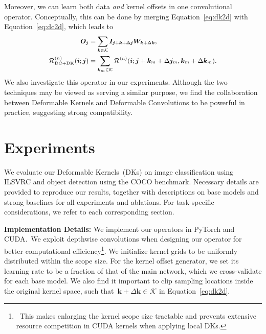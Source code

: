 \documentclass{article} \usepackage{iclr2020_conference, times}
\def\vi{{\bm{i}}}
\def\vj{{\bm{j}}}
\def\vk{{\bm{k}}}
\def\mI{{\bm{I}}}
\def\mO{{\bm{O}}}
\def\mW{{\bm{W}}}
\def\gK{{\mathcal{K}}}
\def\gR{{\mathcal{R}}}
\newcommand{\bfsection}[1]{\noindent\textbf{#1:}}
\begin{document}
Moreover, we can learn both data \textit{and} kernel offsets in one
convolutional operator.
Conceptually, this can be done by merging Equation~\ref{eq:dk2d} with
Equation~\ref{eq:dc2d}, which leads to
\begin{equation}
\small
    \label{eq:dkdc2d}
    \begin{aligned}
        \mO_{\vj}
        &=
        \sum_{\vk \in \gK}
        \mI_{\vj + \vk + \Delta \vj} \mW_{\vk + \Delta \vk},
        \\
        \gR^{(n)}_{\text{DC+DK}}(\vi; \vj)
        &=
        \sum_{\vk_{m} \in \gK}
        \gR^{(n)}(\vi; \vj + \vk_m + \Delta \vj_m, \vk_m + \Delta \vk_m).
    \end{aligned}
\end{equation}
We also investigate this operator in our experiments.
Although the two techniques may be viewed as serving a similar
purpose, we find the collaboration between Deformable
Kernels and Deformable Convolutions to be powerful in practice, suggesting strong compatibility.
 \section{Experiments}

We evaluate our Deformable Kernels~(DKs) on image classification using ILSVRC
and object detection using the COCO benchmark.
Necessary details are provided to reproduce our results, together with
descriptions on base models and strong baselines for all experiments and
ablations.
For task-specific considerations, we refer to each corresponding section.

\bfsection{Implementation Details}
We implement our operators in PyTorch and CUDA.\
We exploit depthwise convolutions when designing our operator for better
computational efficiency\footnote{\
    This makes enlarging the kernel scope size tractable and prevents extensive
    resource competition in CUDA kernels when applying local DKs.
}.
We initialize kernel grids to be uniformly distributed within the scope size.
For the kernel offset generator, we set its learning rate to be a fraction of
that of the main network, which we cross-validate for each base model.
We also find it important to clip sampling locations inside the original kernel
space, such that~$\vk + \Delta \vk \in \gK$ in Equation~\ref{eq:dk2d}.
\end{document}
